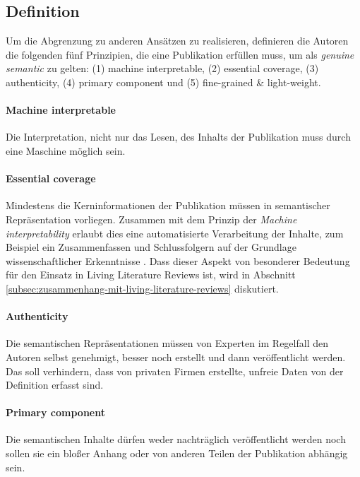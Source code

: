 \subsection{Definition}
\label{subsec:definition}

Um die Abgrenzung zu anderen Ansätzen zu realisieren, definieren die Autoren die folgenden fünf Prinzipien, die eine Publikation erfüllen muss, um als \textit{genuine semantic} zu gelten: (1) machine interpretable, (2) essential coverage, (3) authenticity, (4) primary component und (5) fine-grained \& light-weight.

\paragraph{Machine interpretable}
\label{par:machine-interpretable}
Die Interpretation, nicht nur das Lesen, des Inhalts der Publikation muss durch eine Maschine möglich sein.

\paragraph{Essential coverage}
\label{par:essential-coverage}
Mindestens die Kerninformationen der Publikation müssen in semantischer Repräsentation vorliegen.
Zusammen mit dem Prinzip der \textit{Machine interpretability} erlaubt dies eine automatisierte Verarbeitung der Inhalte, zum Beispiel ein Zusammenfassen und Schlussfolgern auf der Grundlage wissenschaftlicher Erkenntnisse \cite{kuhn2017genuine}.
Dass dieser Aspekt von besonderer Bedeutung für den Einsatz in Living Literature Reviews ist, wird in Abschnitt \ref{subsec:zusammenhang-mit-living-literature-reviews} diskutiert.

\paragraph{Authenticity}
\label{par:authenticity}
Die semantischen Repräsentationen müssen von Experten \textemdash im Regelfall den Autoren selbst \textemdash genehmigt, besser noch erstellt und dann veröffentlicht werden.
Das soll verhindern, dass von privaten Firmen erstellte, unfreie Daten von der Definition erfasst sind.

\paragraph{Primary component}
\label{par:primary-component}
Die semantischen Inhalte dürfen weder nachträglich veröffentlicht werden noch sollen sie ein bloßer Anhang oder von anderen Teilen der Publikation abhängig sein.

